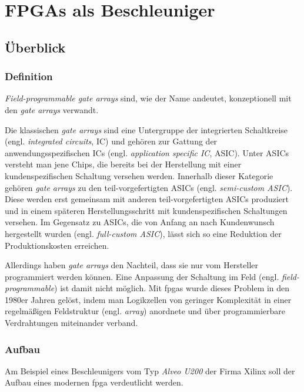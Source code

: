 \chapter{FPGAs als Beschleuniger}

\section{Überblick}

\subsection{Definition}

\textit{Field-programmable gate arrays} sind, wie der Name andeutet,
konzeptionell mit den \textit{gate arrays} verwandt.

Die klassischen \textit{gate arrays} sind eine Untergruppe der integrierten
Schaltkreise (engl. \textit{integrated circuits}, IC) und gehören zur Gattung
der anwendungsspezifischen ICs (engl. \textit{application specific IC}, ASIC).
Unter ASICs versteht man jene Chips, die bereits bei der Herstellung mit einer
kundenspezifischen Schaltung versehen werden. Innerhalb dieser Kategorie gehören
\textit{gate arrays} zu den teil-vorgefertigten ASICs (engl.
\textit{semi-custom ASIC}). Diese werden erst gemeinsam mit anderen
teil-vorgefertigten ASICs produziert und in einem späteren Herstellungsschritt
mit kundenspezifischen Schaltungen versehen. Im Gegensatz zu ASICs, die von
Anfang an nach Kundenwunsch hergestellt wurden (engl.
\textit{full-custom ASIC}), lässt sich so eine Reduktion der Produktionskosten
erreichen. \cite[vgl.][123]{kesel2013}

Allerdings haben \textit{gate arrays} den Nachteil, dass sie nur vom Hersteller
programmiert werden können. Eine Anpassung der Schaltung im Feld (engl.
\textit{field-programmable}) ist damit nicht möglich. Mit \gls{fpga}s wurde
dieses Problem in den 1980er Jahren gelöst, indem man Logikzellen von geringer
Komplexität in einer regelmäßigen Feldstruktur (engl. \textit{array}) anordnete
und über programmierbare Verdrahtungen miteinander verband.
\cite[vgl.][208]{kesel2013} 

\subsection{Aufbau}

Am Beispiel eines Beschleunigers vom Typ \textit{Alveo U200} der Firma Xilinx
soll der Aufbau eines modernen \gls{fpga} verdeutlicht werden.

